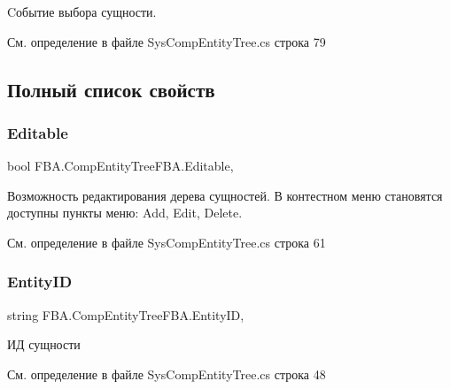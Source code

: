 Cобытие выбора сущности. 



См. определение в файле Sys\+Comp\+Entity\+Tree.\+cs строка 79



\subsection{Полный список свойств}
\mbox{\label{class_f_b_a_1_1_comp_entity_tree_f_b_a_a12ef5fa5ba2abb85fb47d690357819ba}} 
\subsubsection{\texorpdfstring{Editable}{Editable}}
{\footnotesize\ttfamily bool F\+B\+A.\+Comp\+Entity\+Tree\+F\+B\+A.\+Editable\hspace{0.3cm}{\ttfamily [get]}, {\ttfamily [set]}}



Возможность редактирования дерева сущностей. В контестном меню становятся доступны пункты меню\+: Add, Edit, Delete. 



См. определение в файле Sys\+Comp\+Entity\+Tree.\+cs строка 61

\mbox{\label{class_f_b_a_1_1_comp_entity_tree_f_b_a_ad5b5e5f7432e1fe41350bcf742ce32f0}} 
\subsubsection{\texorpdfstring{Entity\+ID}{EntityID}}
{\footnotesize\ttfamily string F\+B\+A.\+Comp\+Entity\+Tree\+F\+B\+A.\+Entity\+ID\hspace{0.3cm}{\ttfamily [get]}, {\ttfamily [set]}}



ИД сущности 



См. определение в файле Sys\+Comp\+Entity\+Tree.\+cs строка 48

